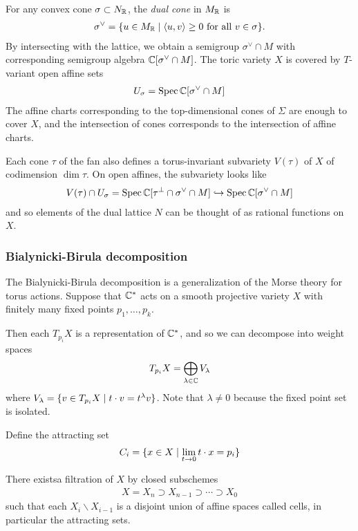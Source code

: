 \hfill

For any convex cone $\sigma \subset N_{\mathbb{R}}$, the \emph{dual cone} in $M_{\mathbb{R}}$ is \begin{align*}
    \sigma^\vee = \{u\in M_{\mathbb{R}} \mid \langle u,v\rangle \geq 0 \text{ for all } v\in \sigma\}.
\end{align*} By intersecting with the lattice, we obtain a semigroup $\sigma^\vee \cap M$
with corresponding semigroup algebra $\mathbb{C}[\sigma^\vee \cap M]$. The toric variety $X$
is covered by $T$-variant open affine sets \begin{align*}
    U_\sigma = \operatorname{Spec} \mathbb{C}[\sigma^\vee \cap M]
\end{align*} The affine charts corresponding to the top-dimensional cones of $\Sigma$ 
are enough to cover $X$, and the intersection of cones corresponds to the intersection of
affine charts.

\hfill

Each cone $\tau$ of the fan also defines a torus-invariant subvariety $V(\tau)$ of $X$ of codimension $\dim \tau$.
On open affines, the subvariety looks like \begin{align*}
    V(\tau) \cap U_\sigma = \operatorname{Spec} \mathbb{C}[\tau^{\perp} \cap \sigma^\vee \cap M] \hookrightarrow \operatorname{Spec} \mathbb{C}[\sigma^\vee \cap M]
\end{align*} and so elements of the dual lattice $N$ can be thought of as rational functions on $X$.
\subsubsection{Bialynicki-Birula decomposition}
The Bialynicki-Birula decomposition is a 
generalization of the Morse theory for torus actions. Suppose 
that $\mathbb{C}^*$ acts on a smooth projective variety $X$ with finitely 
many fixed points $p_1,\ldots,p_k$. 

\hfill

Then each $T_{p_i}X$ is a representation of $\mathbb{C}^*$, and so we can decompose
into weight spaces \begin{align*}
    T_{p_i}X = \bigoplus_{\lambda\in \mathbb{C}} V_\lambda
\end{align*} where $V_\lambda = \{v\in T_{p_i}X \mid t\cdot v = t^\lambda v\}$.
Note that $\lambda\neq 0 $ because the fixed point set is isolated.

Define the attracting set \begin{align*}
    C_i = \{x\in X \mid \lim_{t\to 0} t\cdot x = p_i\}
\end{align*} 

\begin{theorem}
    There existsa filtration of $X$ by closed subschemes \begin{align*}
        X = X_n \supset X_{n-1} \supset \cdots \supset X_0 
    \end{align*} such that 
    each $X_i \backslash X_{i-1}$ is a disjoint union of affine spaces called cells, 
    in particular the attracting sets.
\end{theorem}

